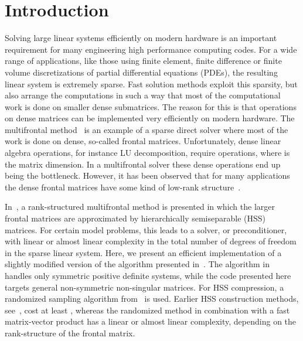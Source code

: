 \documentclass{article}
\newcommand{\ignore}[1]{}
\begin{document}
\section{Introduction}
Solving large linear systems efficiently on modern hardware is an
important requirement for many engineering high performance computing
codes.  For a wide range of applications, like those using finite
element, finite difference or finite volume discretizations of partial
differential equations (PDEs), the resulting linear system is
extremely sparse. Fast solution methods exploit this sparsity, but
also arrange the computations in such a way that most of the
computational work is done on smaller dense submatrices. The reason
for this is that operations on dense matrices can be implemented very
efficiently on modern hardware. The multifrontal
method~\cite{duff1983multifrontal,liu1992multifrontal} is an example
of a sparse direct solver where most of the work is done on dense,
so-called frontal matrices. Unfortunately, dense linear algebra
operations, for instance LU decomposition, require 
operations, where  is the matrix dimension. In a multifrontal
solver these dense operations end up being the bottleneck. However, it
has been observed that for many applications the dense frontal
matrices have some kind of low-rank
structure~\cite{chandrasekaran2010numerical}.

In~\cite{xia2013randomized}, a rank-structured multifrontal method is
presented in which the larger frontal matrices are approximated by
hierarchically semiseparable (HSS)~\cite{vandebril2005bibliography}
matrices. For certain model problems, this leads to a solver, or
preconditioner, with linear or almost linear complexity in the total
number of degrees of freedom in the sparse linear system. Here, we
present an efficient implementation of a slightly modified version of
the algorithm presented in~\cite{xia2013randomized}. The algorithm
in~\cite{xia2013randomized} handles only symmetric positive definite
systems, while the code presented here targets general non-symmetric
non-singular matrices. For HSS compression, a randomized sampling
algorithm from~\cite{martinsson2011fast} is used. Earlier HSS
construction methods, see~\cite{xia2010fast}, cost at least
, whereas the randomized method in combination with
a fast matrix-vector product has a linear or almost linear complexity,
depending on the rank-structure of the frontal matrix.
\ignore{
\todo[inline]{[FH] The sentence above is true only if you have a fast
matvec or in our special sparse context (the sample is assembled
from HSS matvecs), but not in general.
I feel like the intro has a couple sentences about complexity that
are confusing because they mix sparse and dense and don't have enough
context. I would leave only the following: MF=, MF-HSS+RS=-ish
\textbf{for model problems}.}
}
\end{document}
